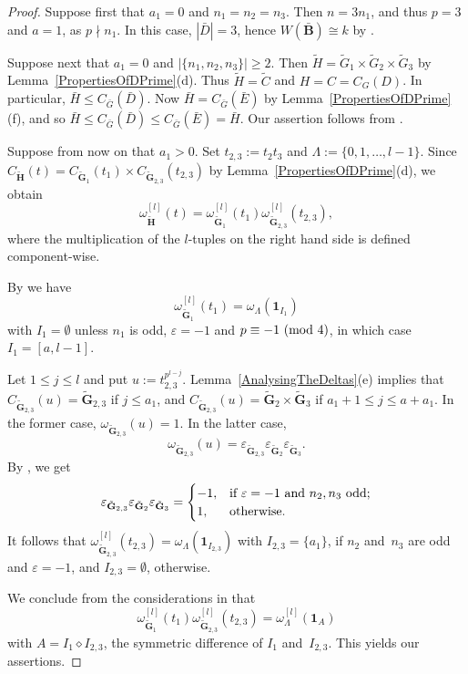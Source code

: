 \documentclass[12pt]{amsart}
\newcommand{\bG}{{\mathbf{G}}}      %
\newcommand{\bB}{{\mathbf{B}}}
\newcommand{\bH}{{\mathbf{H}}}
\theoremstyle{theorem}
\theoremstyle{definition}
\theoremstyle{remark}
\begin{document}
\begin{proof}
Suppose first that $a_1 = 0$ and $n_1 = n_2 = n_3$. Then $n = 3n_1$, and thus 
$p = 3$ and $a = 1$, as $p \nmid n_1$. In this case, $|\bar{D}| = 3$, hence 
$W( \bar{\bB} ) \cong k$ by \cite[Lemma~$3.6$(b)]{HL24}.

Suppose next that $a_1 = 0$ and $|\{ n_1, n_2, n_3 \}| \geq 2$. Then
$\tilde{H} = \tilde{G}_1 \times \tilde{G}_2 \times \tilde{G}_3$ by
Lemma~\ref{PropertiesOfDPrime}(d). Thus $\tilde{H} = \tilde{C}$ and
$H = C = C_G( D )$. In particular, $\bar{H} \leq C_{\bar{G}}( \bar{D} )$.
Now $\bar{H} = C_{\bar{G}}( \bar{E} )$ by Lemma~\ref{PropertiesOfDPrime}(f), and 
so $\bar{H} \leq C_{\bar{G}}( \bar{D} ) \leq C_{\bar{G}}( \bar{E} ) = \bar{H}$. 
Our assertion follows from \cite[Lemma~$3.6$(b)]{HL24}.

Suppose from now on that $a_1 > 0$. Set $t_{2,3} := t_2t_3$ and 
$\Lambda := \{ 0, 1, \ldots , l - 1 \}$. Since $C_{\tilde{\bH}}( t )
= C_{\tilde{\bG}_1}( t_1 ) \times C_{\tilde{\bG}_{2,3}}( t_{2,3} )$ by
Lemma~\ref{PropertiesOfDPrime}(d), we obtain 
$$\omega_{\tilde{\bH}}^{[l]}( t ) = 
\omega_{\tilde{\bG}_1}^{[l]}( t_1 ) 
\omega_{\tilde{\bG}_{2,3}}^{[l]}( t_{2,3} ),$$
where the multiplication of the $l$-tuples on the right hand side is defined
component-wise. 

By \cite[Corollary~$4.1.4$]{HL25}
we have
$$\omega_{\tilde{\bG}_1}^{[l]}( t_1 ) = \omega_{\Lambda}( \mathbf{1}_{I_1} )$$
with $I_1 = \emptyset$ unless $n_1$ is odd, $\varepsilon = -1$ and
$p \equiv -1\,\,(\mbox{\rm mod}\,\,4)$, in which case $I_1 = [a, l - 1]$.

Let $1 \leq j \leq l$ and put $u := t_{2,3}^{p^{l-j}}$.
Lemma~\ref{AnalysingTheDeltas}(e) implies that
$C_{\tilde{\bG}_{2,3}}( u ) = \tilde{\bG}_{2,3}$ if $j \leq a_1$, and
$C_{\tilde{\bG}_{2,3}}( u ) = \tilde{\bG}_2 \times \tilde{\bG}_3$ if
$a_1 + 1 \leq j \leq a + a_1$. In the former case, 
$\omega_{\tilde{\bG}_{2,3}}( u ) = 1$. In the latter case,
$$\omega_{\tilde{\bG}_{2,3}}( u ) = 
\varepsilon_{\tilde{\bG}_{2,3}}\varepsilon_{\tilde{\bG}_{2}}\varepsilon_{\tilde{\bG}_{3}}.$$
By \cite[Example~$2.5.5$]{HL25}, we get
$$
\varepsilon_{\tilde{\bG}_{2,3}}\varepsilon_{\tilde{\bG}_{2}}\varepsilon_{\tilde{\bG}_{3}} =
\begin{cases}
-1, & \text{\rm if}\  \varepsilon = -1 \text{\rm\ and\ } n_2, n_3 \text{\rm\ odd}; \\
 1, & \text{\rm otherwise}.
\end{cases}
$$
It follows that $\omega_{\tilde{\bG}_{2,3}}^{[l]}( t_{2,3} ) = 
\omega_{\Lambda}( \mathbf{1}_{I_{2,3}} )$ with $I_{2,3} = \{ a_1 \}$,
if $n_2$ and~$n_3$ are odd and $\varepsilon = -1$, and $I_{2,3} = \emptyset$, 
otherwise.

We conclude from the considerations in \cite[Subsection~$2.2$]{HL25} that
$$\omega_{\tilde{\bG}_1}^{[l]}( t_1 ) \omega_{\tilde{\bG}_{2,3}}^{[l]}( t_{2,3} ) =
\omega_{\Lambda}^{[l]}( \mathbf{1}_{A} )$$ 
with $A = I_1 \diamond I_{2,3}$, 
the symmetric difference of $I_1$ and~$I_{2,3}$. This yields our assertions.
\end{proof}
\end{document}

